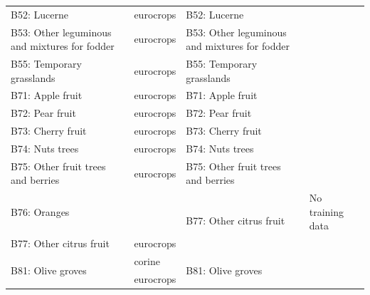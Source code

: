 \begin{table}[]
{\begin{tabular}{llll}
B52: Lucerne                                  & eurocrops               & B52: Lucerne                                          &                                                           \\
B53: Other leguminous and mixtures for fodder & eurocrops               & B53: Other leguminous and mixtures for fodder         &                                                           \\
B55: Temporary grasslands                     & eurocrops               & B55: Temporary grasslands                             &                                                           \\
B71: Apple fruit                              & eurocrops               & B71: Apple fruit                                      &                                                           \\
B72: Pear fruit                               & eurocrops               & B72: Pear fruit                                       &                                                           \\
B73: Cherry fruit                             & eurocrops               & B73: Cherry fruit                                     &                                                           \\
B74: Nuts trees                               & eurocrops               & B74: Nuts trees                                       &                                                           \\
B75: Other fruit trees and berries            & eurocrops               & B75: Other fruit trees and berries                    &                                                           \\
B76: Oranges                                  &                         & \multirow{2}{*}{B77: Other citrus fruit}              & No training data                                          \\
B77: Other citrus fruit                       & eurocrops               &                                                       &                                                           \\
\multirow{2}{*}{B81: Olive groves}            & corine                  & \multirow{2}{*}{B81: Olive groves}                    &                                                           \\
                                              & eurocrops               &                                                       &                                                           \\

\end{tabular}}
\end{table}
